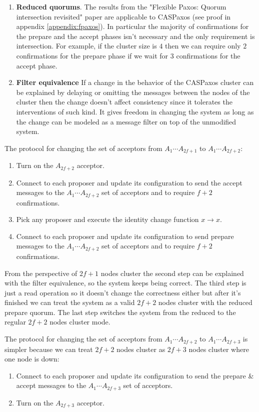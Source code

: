 \documentclass[12pt]{article}
\begin{document}
\begin{enumerate}
  \item {\bf Reduced quorums}. The results from the "Flexible Paxos: Quorum intersection revisited"\cite{fpaxos} paper are applicable to CASPaxos (see proof in appendix \ref{appendix:fpaxos}). In particular the majority of confirmations for the prepare and the accept phases isn't necessary and the only requirement is intersection. For example, if the cluster size is $4$ then we can require only $2$ confirmations for the prepare phase if we wait for $3$ confirmations for the accept phase.
  
  \item {\bf Filter equivalence} If a change in the behavior of the CASPaxos cluster can be explained by delaying or omitting the messages between the nodes of the cluster then the change doesn't affect consistency since it tolerates the interventions of such kind. It gives freedom in changing the system as long as the change can be modeled as a message filter on top of the unmodified system.
\end{enumerate}

The protocol for changing the set of acceptors from $A_1 \cdots A_{2f+1}$ to $A_1 \cdots A_{2f+2}$:
\begin{enumerate}
  \item Turn on the $A_{2f+2}$ acceptor.
  \item Connect to each proposer and update its configuration to send the accept messages to the $A_1 \cdots A_{2f+2}$ set of acceptors and to require $f+2$ confirmations.
  \item Pick any proposer and execute the identity change function $x \to x$.
  \item Connect to each proposer and update its configuration to send prepare messages to the $A_1 \cdots A_{2f+2}$ set of acceptors and to require $f+2$ confirmations.
\end{enumerate}

From the perspective of $2f+1$ nodes cluster the second step can be explained with the filter equivalence, so the system keeps being correct. The third step is just a read operation so it doesn't change the correctness either but after it's finished we can treat the system as a valid $2f+2$ nodes cluster with the reduced prepare quorum. The last step switches the system from the reduced to the regular $2f+2$ nodes cluster mode.

The protocol for changing the set of acceptors from $A_1 \cdots A_{2f+2}$ to $A_1 \cdots A_{2f+3}$ is simpler because we can treat $2f+2$ nodes cluster as $2f+3$ nodes cluster where one node is down:
\begin{enumerate}
  \item Connect to each proposer and update its configuration to send the prepare \& accept messages to the $A_1 \cdots A_{2f+3}$ set of acceptors.
  \item Turn on the $A_{2f+3}$ acceptor.
\end{enumerate}
\end{document}
